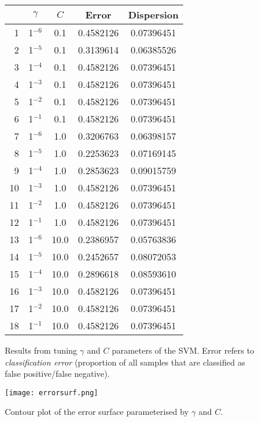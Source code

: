 \documentclass[paper=a4, fontsize=11pt]{scrartcl}
\numberwithin{equation}{section}
\numberwithin{figure}{section}
\numberwithin{table}{section}
\begin{document}
\begin{figure}[0.5\textwidth]
\centering
\begin{tabular}{r | c c | c c}
 & $\gamma$ & $C$ & Error & Dispersion \\ \hline \hline
1&1$^{-6}$&0.1&0.4582126&0.07396451\\
2&1$^{-5}$&0.1&0.3139614&0.06385526\\
3&1$^{-4}$&0.1&0.4582126&0.07396451\\
4&1$^{-3}$&0.1&0.4582126&0.07396451\\
5&1$^{-2}$&0.1&0.4582126&0.07396451\\
6&1$^{-1}$&0.1&0.4582126&0.07396451\\ \hline
7&1$^{-6}$&1.0&0.3206763&0.06398157\\
8&1$^{-5}$&1.0&0.2253623&0.07169145\\
9&1$^{-4}$&1.0&0.2853623&0.09015759\\
10&1$^{-3}$&1.0&0.4582126&0.07396451\\
11&1$^{-2}$&1.0&0.4582126&0.07396451\\
12&1$^{-1}$&1.0&0.4582126&0.07396451\\ \hline
\rowcolor{rowgrey}
13&1$^{-6}$&10.0&0.2386957&0.05763836\\
\rowcolor{white}
14&1$^{-5}$&10.0&0.2452657&0.08072053\\
15&1$^{-4}$&10.0&0.2896618&0.08593610\\
16&1$^{-3}$&10.0&0.4582126&0.07396451\\
17&1$^{-2}$&10.0&0.4582126&0.07396451\\
18&1$^{-1}$&10.0&0.4582126&0.07396451\\
\end{tabular}
\caption{Results from tuning $\gamma$ and $C$ parameters of the SVM. Error
refers to \emph{classification error} (proportion of all samples that are
classified as false positive/false negative).}
\label{tuningtable}
\end{figure}

\begin{figure}
\texttt{[image: errorsurf.png]}
\caption{Contour plot of the error surface parameterised by $\gamma$ and $C$.}
\label{tuningtable}
\end{figure}
\end{document}
